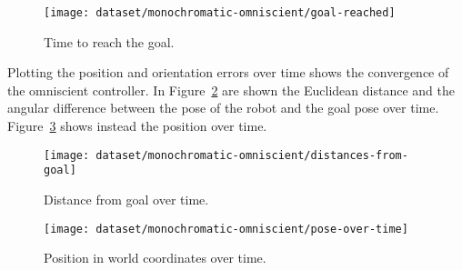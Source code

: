\begin{figure}[htbp]
\centerline{\texttt{[image: dataset/monochromatic-omniscient/goal-reached]}}
	\caption{Time to reach the goal.}
	\label{fig:goal-reached-omniscient}
\end{figure}

Plotting the position and orientation errors over time shows the convergence of 
the omniscient controller. In Figure~\ref{fig:distance-from-goal-omniscient} 
are shown the Euclidean distance and the angular difference between the pose of 
the robot and the goal pose over time. Figure~\ref{fig:position-over-time} shows instead the position over time.

\begin{figure}[htbp]
\centerline{\texttt{[image: dataset/monochromatic-omniscient/distances-from-goal]}}
	\caption{Distance from goal over time.}
	\label{fig:distance-from-goal-omniscient}
\end{figure}

\begin{figure}[htbp]
\centerline{\texttt{[image: dataset/monochromatic-omniscient/pose-over-time]}}
	\caption{Position in world coordinates over time.}
	\label{fig:position-over-time}
\end{figure}
